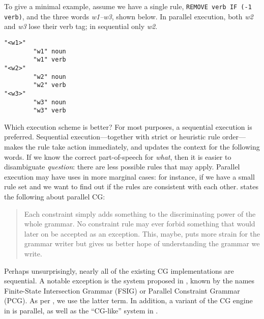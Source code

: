 To give a minimal example, assume we have a single rule, \texttt{REMOVE verb IF (-1 verb)}, and the three words \emph{w1--w3}, shown below. 
In parallel execution, both \emph{w2} and \emph{w3} lose their verb tag; in sequential only \emph{w2}.


\begin{verbatim}
"<w1>"
        "w1" noun
        "w1" verb
"<w2>"
        "w2" noun
        "w2" verb
"<w3>"
        "w3" noun
        "w3" verb
\end{verbatim}


Which execution scheme is better? For most purposes, a sequential execution is preferred.  Sequential execution–--together with strict or heuristic rule order---makes the rule take action immediately, and updates the context for the following words. 
If we know the correct part-of-speech for \emph{what}, then it is easier to disambiguate \emph{question}: there are less possible rules that may apply. 
Parallel execution may have uses in more marginal cases: for instance, if we have a small rule set and we want to find out if the rules are consistent with each other.
\cite{koskenniemi90} states the following about parallel CG:

 \begin{quote}
 Each constraint simply adds something to the discriminating power of the
 whole grammar. No constraint rule may ever forbid something that would
 later on be accepted as an exception. This, maybe, puts more strain for
 the grammar writer but gives us better hope of understanding the grammar
 we write.
 \end{quote}

Perhaps unsurprisingly, nearly all of the existing CG implementations are sequential.
A notable exception is the system proposed in \cite{koskenniemi90}, known by the names Finite-State Intersection Grammar (FSIG) or Parallel Constraint Grammar (PCG). 
As per \cite{koskenniemi97}, we use the latter term. 
In addition, a variant of the CG engine in \cite{listenmaa_claessen2015} is parallel,
as well as the ``CG-like'' system in \cite{lager98}.





